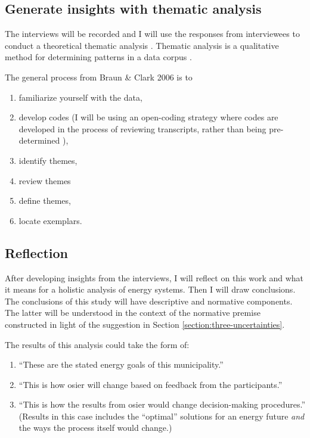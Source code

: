 \subsection{Generate insights with thematic analysis}

The interviews will be recorded and I will use the responses from interviewees
to conduct a theoretical thematic analysis
\cite{braun_toward_2023,maguire_doing_2017,scharp_what_2019}. Thematic analysis
is a qualitative method for determining patterns in a data corpus
\cite{scharp_what_2019}. 

The general process from Braun \& Clark 2006 \cite{braun_using_2006} is to
\begin{enumerate}
    \item familiarize yourself with the data,
    \item develop codes (I will be using an open-coding strategy where codes are
    developed in the process of reviewing transcripts, rather than being
    pre-determined \cite{maguire_doing_2017}),
    \item identify themes,
    \item review themes
    \item define themes, 
    \item locate exemplars.
\end{enumerate}


\subsection{Reflection}

After developing insights from the interviews, I will reflect on this work and
what it means for a holistic analysis of energy systems. Then I will draw
conclusions. The conclusions of this study will have descriptive and normative
components. The latter will be understood in the context of the normative
premise constructed in light of the suggestion in Section
\ref{section:three-uncertainties}.

The results of this analysis could take the form of:
    \begin{enumerate}
        \item ``These are the stated energy goals of this municipality.''
        \item ``This is how \ac{osier} will change based on feedback from the
        participants.''
        \item ``This is how the results from \ac{osier} would change
        decision-making procedures.'' (Results in this case includes the
        ``optimal'' solutions for an energy future \textit{and} the ways the
        process itself would change.)
    \end{enumerate}

